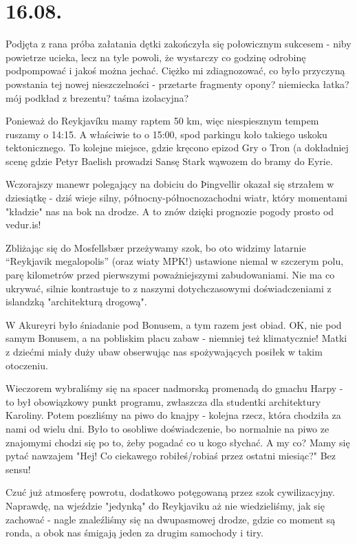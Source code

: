 \chapter*{16.08.}

Podjęta z rana próba załatania dętki zakończyła się połowicznym sukcesem - niby powietrze ucieka, lecz na tyle powoli, że wystarczy co godzinę odrobinę podpompować i jakoś można jechać. Ciężko mi zdiagnozować, co było przyczyną powstania tej nowej nieszczelności - przetarte fragmenty opony? niemiecka łatka? mój podkład z brezentu? taśma izolacyjna?

Ponieważ do Reykjavíku mamy raptem 50 km, więc niespiesznym tempem ruszamy o 14:15. A właściwie to o 15:00, spod parkingu koło takiego uskoku tektonicznego. To kolejne miejsce, gdzie kręcono epizod Gry o Tron (a dokładniej scenę gdzie Petyr Baelish prowadzi Sansę Stark wąwozem do bramy do Eyrie.

Wczorajszy manewr polegający na dobiciu do Þingvellir okazał się strzałem w dziesiątkę - dziś wieje silny, północny-północnozachodni wiatr, który momentami "kładzie" nas na bok na drodze. A to znów dzięki prognozie pogody prosto od vedur.is!

Zbliżając się do Mosfellsbær przeżywamy szok, bo oto widzimy latarnie “Reykjavik megalopolis” (oraz wiaty MPK!) ustawione niemal w szczerym polu, parę kilometrów przed pierwszymi poważniejszymi zabudowaniami. Nie ma co ukrywać, silnie kontrastuje to z naszymi dotychczasowymi doświadczeniami z islandzką "architekturą drogową".


W Akureyri było śniadanie pod Bonusem, a tym razem jest obiad. OK, nie pod samym Bonusem, a na pobliskim placu zabaw - niemniej też klimatycznie! Matki z dziećmi miały duży ubaw obserwując nas spożywających posiłek w takim otoczeniu.

Wieczorem wybraliśmy się na spacer nadmorską promenadą do gmachu Harpy - to był obowiązkowy punkt programu, zwłaszcza dla studentki architektury Karoliny. Potem poszliśmy na piwo do knajpy - kolejna rzecz, która chodziła za nami od wielu dni. Było to osobliwe doświadczenie, bo normalnie na piwo ze znajomymi chodzi się po to, żeby pogadać co u kogo słychać. A my co? Mamy się pytać nawzajem "Hej! Co ciekawego robiłeś/robiaś przez ostatni miesiąc?" Bez sensu!

Czuć już atmosferę powrotu, dodatkowo potęgowaną przez szok cywilizacyjny. Naprawdę, na wjeździe "jedynką" do Reykjaviku aż nie wiedzieliśmy, jak się zachować - nagle znaleźliśmy się na dwupasmowej drodze, gdzie co moment są ronda, a obok nas śmigają jeden za drugim samochody i tiry.

